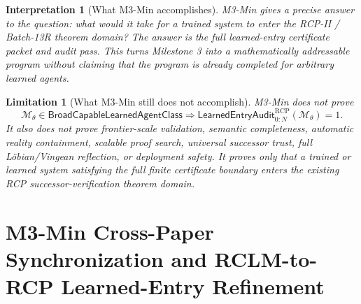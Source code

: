 \documentclass[11pt]{article}
\newtheorem{interpretation}[theorem]{Interpretation}
\newtheorem{limitation}[theorem]{Limitation}
\newcommand{\1}{\mathbf{1}}
\newcommand{\RCP}{\mathrm{RCP}}
\begin{document}
\begin{interpretation}[What M3-Min accomplishes]
M3-Min gives a precise answer to the question: what would it take for a trained system to enter the RCP-II / Batch-13R theorem domain?  The answer is the full learned-entry certificate packet and audit pass.  This turns Milestone 3 into a mathematically addressable program without claiming that the program is already completed for arbitrary learned agents.
\end{interpretation}

\begin{limitation}[What M3-Min still does not accomplish]
\label{lim:m3_min_what_not_accomplished}
M3-Min does not prove
\[
\mathcal M_\theta\in\mathsf{BroadCapableLearnedAgentClass}
\Longrightarrow
\mathsf{LearnedEntryAudit}_{0:N}^{\RCP}(\mathcal M_\theta)=1.
\]
It also does not prove frontier-scale validation, semantic completeness, automatic reality containment, scalable proof search, universal successor trust, full L\"obian/Vingean reflection, or deployment safety.  It proves only that a trained or learned system satisfying the full finite certificate boundary enters the existing RCP successor-verification theorem domain.
\end{limitation}

\begin{center}
\end{center}


\section{M3-Min Cross-Paper Synchronization and RCLM-to-RCP Learned-Entry Refinement}
\label{sec:m3_min_cross_paper_synchronization}
\end{document}
